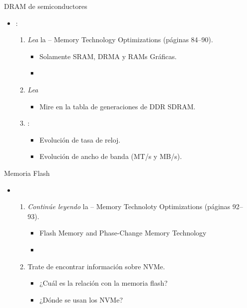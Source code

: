 \begin{frame}[t]{DRAM de semiconductores}
  \begin{itemize}
    \item {}:
      \begin{enumerate}
        \item \emph{Lea} la  -- 
              Memory Technology Optimizations (páginas 84--90).
          \begin{itemize}
            \item Solamente SRAM, DRMA y RAMs Gráficas.
            \item \bibhennessy
          \end{itemize}

        \item \emph{Lea} 
          \begin{itemize}
            \item Mire en la tabla de generaciones de DDR SDRAM.
          \end{itemize}

        \item {}:
          \begin{itemize}
            \item Evolución de tasa de reloj.
            \item Evolución de ancho de banda (MT/s y MB/s).
          \end{itemize}
      \end{enumerate}
  \end{itemize}
\end{frame}

\begin{frame}[t]{Memoria Flash}
  \begin{itemize}
    \item {}
      \begin{enumerate}
        \item \emph{Continúe leyendo} la  -- 
              Memory Technoloty Optimizations (páginas 92--93).
          \begin{itemize}
            \item Flash Memory and Phase-Change Memory Technology
            \item \bibhennessy
          \end{itemize}

        \item Trate de encontrar información sobre NVMe.
          \begin{itemize}
            \item ¿Cuál es la relación con la memoria flash?
            \item ¿Dónde se usan los NVMe?
          \end{itemize}
      \end{enumerate}
  \end{itemize}
\end{frame}

